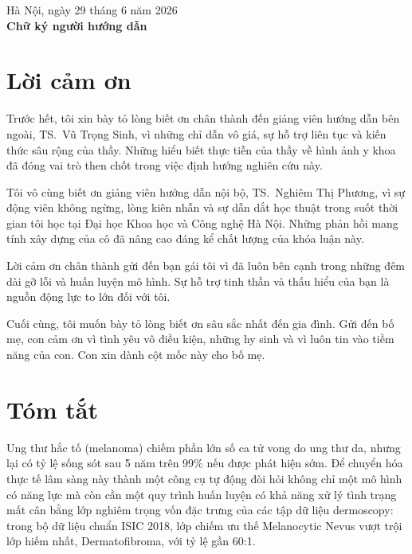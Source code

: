 \documentclass[11pt,a4paper]{report}
\begin{document}
\vspace{1.5cm}

\hfill\begin{minipage}{0.45\textwidth}
\centering
Hà Nội, ngày 29 tháng 6 năm 2026 \\[0.3cm]
\textbf{Chữ ký người hướng dẫn}
\end{minipage}

\newpage

\chapter*{Lời cảm ơn}

Trước hết, tôi xin bày tỏ lòng biết ơn chân thành đến giảng viên hướng dẫn bên ngoài, TS.~Vũ Trọng Sinh, vì những chỉ dẫn vô giá, sự hỗ trợ liên tục và kiến thức sâu rộng của thầy. Những hiểu biết thực tiễn của thầy về hình ảnh y khoa đã đóng vai trò then chốt trong việc định hướng nghiên cứu này.

Tôi vô cùng biết ơn giảng viên hướng dẫn nội bộ, TS.~Nghiêm Thị Phương, vì sự động viên không ngừng, lòng kiên nhẫn và sự dẫn dắt học thuật trong suốt thời gian tôi học tại Đại học Khoa học và Công nghệ Hà Nội. Những phản hồi mang tính xây dựng của cô đã nâng cao đáng kể chất lượng của khóa luận này.

Lời cảm ơn chân thành gửi đến bạn gái tôi vì đã luôn bên cạnh trong những đêm dài gỡ lỗi và huấn luyện mô hình. Sự hỗ trợ tinh thần và thấu hiểu của bạn là nguồn động lực to lớn đối với tôi.

Cuối cùng, tôi muốn bày tỏ lòng biết ơn sâu sắc nhất đến gia đình. Gửi đến bố mẹ, con cảm ơn vì tình yêu vô điều kiện, những hy sinh và vì luôn tin vào tiềm năng của con. Con xin dành cột mốc này cho bố mẹ.

\chapter*{Tóm tắt}

Ung thư hắc tố (melanoma) chiếm phần lớn số ca tử vong do ung thư da, nhưng lại có tỷ lệ sống sót sau 5 năm trên 99\% nếu được phát hiện sớm. Để chuyển hóa thực tế lâm sàng này thành một công cụ tự động đòi hỏi không chỉ một mô hình có năng lực mà còn cần một quy trình huấn luyện có khả năng xử lý tình trạng mất cân bằng lớp nghiêm trọng vốn đặc trưng của các tập dữ liệu dermoscopy: trong bộ dữ liệu chuẩn ISIC 2018, lớp chiếm ưu thế Melanocytic Nevus vượt trội lớp hiếm nhất, Dermatofibroma, với tỷ lệ gần 60:1.
\end{document}

